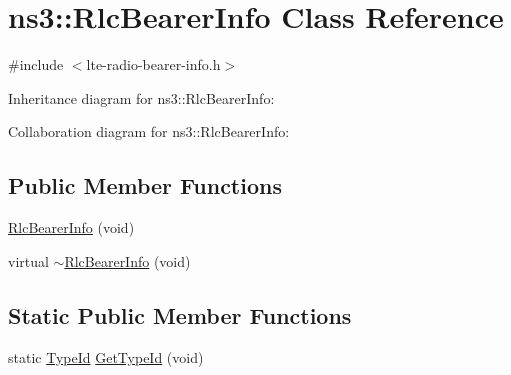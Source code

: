\hypertarget{classns3_1_1RlcBearerInfo}{}\section{ns3\+:\+:Rlc\+Bearer\+Info Class Reference}
\label{classns3_1_1RlcBearerInfo}


{\ttfamily \#include $<$lte-\/radio-\/bearer-\/info.\+h$>$}



Inheritance diagram for ns3\+:\+:Rlc\+Bearer\+Info\+:


Collaboration diagram for ns3\+:\+:Rlc\+Bearer\+Info\+:
\subsection*{Public Member Functions}
\begin{DoxyCompactItemize}
\item 
\hyperlink{classns3_1_1RlcBearerInfo_a1daba722caf596e84d759786f6a0a4ec}{Rlc\+Bearer\+Info} (void)
\item 
virtual \hyperlink{classns3_1_1RlcBearerInfo_a40d43dc1ea70562848193ba0b8af3a4d}{$\sim$\+Rlc\+Bearer\+Info} (void)
\end{DoxyCompactItemize}
\subsection*{Static Public Member Functions}
\begin{DoxyCompactItemize}
\item 
static \hyperlink{classns3_1_1TypeId}{Type\+Id} \hyperlink{classns3_1_1RlcBearerInfo_a57f8cc8e9e11bc2038a0b90609c6c583}{Get\+Type\+Id} (void)
\end{DoxyCompactItemize}
